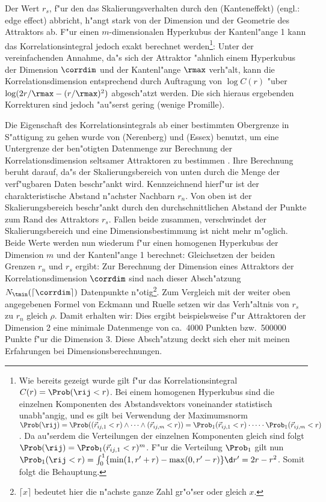 Der Wert $r_s$, f"ur den das Skalierungsverhalten durch den \begriff(Kanteneffekt)
(engl.: edge effect) abbricht, h"angt stark von
der Dimension und der Geometrie des Attraktors ab. 
F"ur einen $m$-dimensionalen Hyperkubus der Kantenl"ange 1 kann das 
Korrelationsintegral jedoch exakt berechnet werden\footnote{Wie bereits gezeigt wurde gilt f"ur das Korrelationsintegral
$C(r)=\Prob(\rij<r)$. Bei einem homogenen Hyperkubus sind die einzelnen Komponenten des
Abstandsvektors voneinander statistisch unabh"angig, und es gilt bei Verwendung der
Maximumsnorm $\Prob(\rij)=\Prob((\vec r_{ij,1} < r) \land\dots\land (\vec r_{ij,m} < r)) = \Prob_1(\vec
r_{ij,1} < r)\cdot\dots\cdot \Prob_1(\vec r_{ij,m} < r)$. Da au"serdem die Verteilungen der
einzelnen Komponenten gleich sind folgt $\Prob(\rij)=\Prob_1(\vec r_{ij,1} < r)^m$. F"ur die
Verteilung $\Prob_1$ gilt nun $\Prob_1(\rij<r)=\int_0^1 \{\min(1,r'+r)-\max(0,r'-r)\}\d r'=
2r-r^2$. Somit folgt die Behauptung.
}:
Unter der vereinfachenden Annahme, da"s sich der Attraktor "ahnlich einem Hyperkubus
der Dimension $\corrdim$ und der Kantenl"ange $\rmax$ verh"alt, kann die Korrelationsdimension entsprechend
 durch Auftragung von $\log C(r)$ "uber $\log(2r/\rmax-(r/\rmax)^2)$
abgesch"atzt werden. Die sich hieraus ergebenden Korrekturen  
sind jedoch "au"serst gering (wenige Promille).

Die Eigenschaft des Korrelationsintegrals ab einer bestimmten Obergrenze in S"attigung zu
gehen wurde von \autor(Nerenberg) und \autor(Essex) benutzt, um eine Untergrenze der
ben"otigten Datenmenge zur Berechnung der Korrelationsdimension seltsamer Attraktoren
 zu bestimmen \cite{Nerenberg-essex}. Ihre Berechnung beruht darauf, da"s der Skalierungsbereich
von unten durch die Menge der verf"ugbaren Daten beschr"ankt wird. Kennzeichnend hierf"ur
ist der charakteristische Abstand n"achster Nachbarn $r_n$. Von oben ist der Skalierungsbereich
beschr"ankt durch den durchschnittlichen Abstand der Punkte zum Rand des Attraktors
$r_s$. Fallen beide zusammen, verschwindet der Skalierungsbereich und eine
Dimensionsbestimmung ist nicht mehr m"oglich. Beide Werte werden nun wiederum f"ur einen
homogenen Hyperkubus der Dimension $m$ und der Kantenl"ange 1 berechnet:
Gleichsetzen der beiden Grenzen $r_n$ und $r_s$ ergibt:
Zur Berechnung der Dimension eines Attraktors der Korrelationsdimension $\corrdim$ sind nach
dieser Absch"atzung $N_\tmin(\lceil \corrdim \rceil)$ Datenpunkte n"otig\footnote{$\lceil x \rceil$
bedeutet hier die n"achste ganze Zahl gr"o"ser oder gleich $x$.}. Zum Vergleich mit der
weiter oben angegebenen Formel von Eckmann  und Ruelle setzen wir das Verh"altnis
von $r_s$ zu $r_n$ gleich $\rho$. Damit erhalten wir:
Dies ergibt beispielsweise f"ur Attraktoren der Dimension 2 eine minimale Datenmenge von
ca.\  4000 Punkten bzw.\  500000 Punkte f"ur die Dimension 3. Diese Absch"atzung deckt
sich eher mit meinen Erfahrungen bei Dimensionsberechnungen. 





